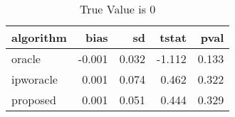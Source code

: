 \begin{table}[h!]
\caption{True Value is 0}
\centering
\begin{tabular}[t]{lrrrr}
\toprule
algorithm & bias & sd & tstat & pval\\
\midrule
oracle & -0.001 & 0.032 & -1.112 & 0.133\\
ipworacle & 0.001 & 0.074 & 0.462 & 0.322\\
proposed & 0.001 & 0.051 & 0.444 & 0.329\\
\bottomrule
\end{tabular}
\end{table}
